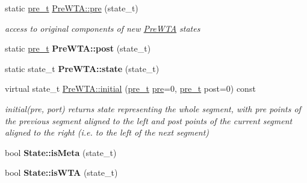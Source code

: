 \begin{DoxyCompactItemize}
\mbox{\label{group__schemata_gaab30a1faaa381ecfabd705a8c12d179b}} 
static \mbox{\hyperlink{group__general_ga092fe8b972dfa977c2a0886720a7731e}{pre\+\_\+t}} \mbox{\hyperlink{group__schemata_gaab30a1faaa381ecfabd705a8c12d179b}{Pre\+W\+T\+A\+::pre}} (state\+\_\+t)
\begin{DoxyCompactList}\small\item\em access to original components of new \mbox{\hyperlink{classPreWTA}{Pre\+W\+TA}} states \end{DoxyCompactList}\item 
\mbox{\label{group__schemata_ga2c8c24b19312ad6436eaf76e4506e02f}} 
static \mbox{\hyperlink{group__general_ga092fe8b972dfa977c2a0886720a7731e}{pre\+\_\+t}} {\bfseries Pre\+W\+T\+A\+::post} (state\+\_\+t)
\item 
\mbox{\label{group__schemata_ga3e74404d5f453b8eed85254791724ffe}} 
static state\+\_\+t {\bfseries Pre\+W\+T\+A\+::state} (state\+\_\+t)
\item 
\mbox{\label{group__schemata_gaf47213e6243f48f06681089e03fa08ef}} 
virtual state\+\_\+t \mbox{\hyperlink{group__schemata_gaf47213e6243f48f06681089e03fa08ef}{Pre\+W\+T\+A\+::initial}} (\mbox{\hyperlink{group__general_ga092fe8b972dfa977c2a0886720a7731e}{pre\+\_\+t}} \mbox{\hyperlink{group__schemata_gaab30a1faaa381ecfabd705a8c12d179b}{pre}}=0, \mbox{\hyperlink{group__general_ga092fe8b972dfa977c2a0886720a7731e}{pre\+\_\+t}} post=0) const
\begin{DoxyCompactList}\small\item\em initial(pre, port) returns state representing the whole segment, with pre points of the previous segment aligned to the left and post points of the current segment aligned to the right (i.\+e. to the left of the next segment) \end{DoxyCompactList}\item 
\mbox{\label{group__schemata_gaa5b5cf5f92a0c443d4c1a1e152f9292c}} 
bool {\bfseries State\+::is\+Meta} (state\+\_\+t)
\item 
\mbox{\label{group__schemata_ga1722ba39591c8a25ed5ee91e9e91232a}} 
bool {\bfseries State\+::is\+W\+TA} (state\+\_\+t)
\item 

\end{DoxyCompactItemize}
